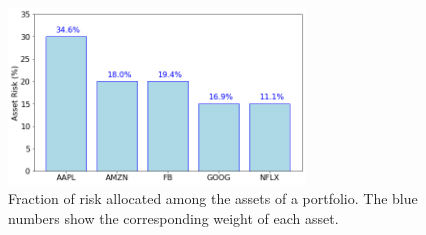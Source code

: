 \begin{figure}[htb]
\centering
\includegraphics[width=0.7\textwidth]{figures/risk_allocation}
\caption{Fraction of risk allocated among the assets of a portfolio. The blue numbers show the corresponding weight of each asset.}
\label{fig:risk_allocation}
\end{figure}

